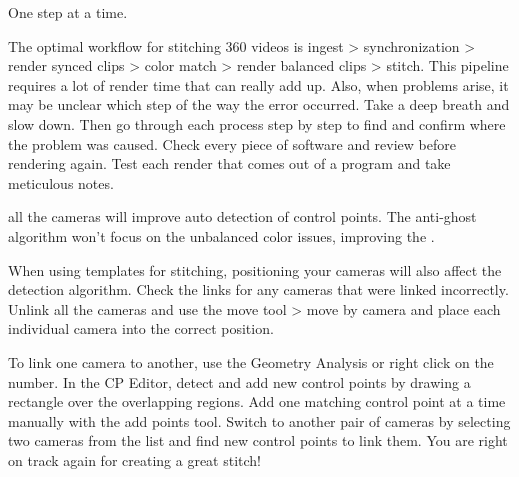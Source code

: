 \begin{fullwidth}

{\large One step at a time. \par}

The optimal workflow for stitching 360 videos is ingest > synchronization > render synced clips > color match > render balanced clips > stitch. This pipeline requires a lot of render time that can really add up. Also, when problems arise, it may be unclear which step of the way the error occurred. Take a deep breath and slow down. Then go through each process step by step to find and confirm where the problem was caused. Check every piece of software and review before rendering again. Test each render that comes out of a program and take meticulous notes. 

\textbf{} all the cameras will improve auto detection of control points. The anti-ghost algorithm won’t focus on the unbalanced color issues, improving the \textbf{}. 


When using templates for stitching, positioning your cameras will also affect the detection algorithm. Check the links for any cameras that were linked incorrectly. Unlink all the cameras and use the move tool > move by camera and place each individual camera into the correct position.


\clearpage
To link one camera to another, use the Geometry Analysis or right click on the number. In the CP Editor, detect and add new control points by drawing a rectangle over the overlapping regions. Add one matching control point at a time manually with the add points tool. Switch to another pair of cameras by selecting two cameras from the list and find new control points to link them. You are right on track again for creating a great stitch!



\clearpage
\end{fullwidth}